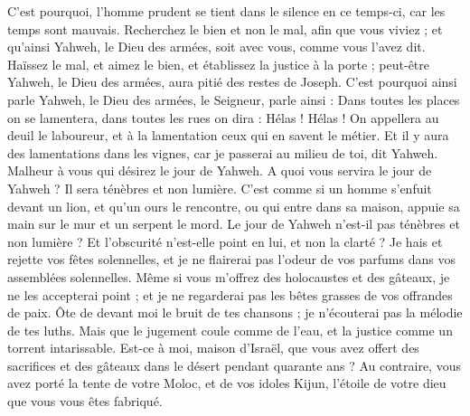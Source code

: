 \begin{multicols}{2}
C'est pourquoi, l'homme prudent se tient dans le silence en ce temps-ci, car les temps sont mauvais.
Recherchez le bien et non le mal, afin que vous viviez ; et qu'ainsi Yahweh, le Dieu des armées, soit avec vous, comme vous l'avez dit.
Haïssez le mal, et aimez le bien, et établissez la justice à la porte ; peut-être Yahweh, le Dieu des armées, aura pitié des restes de Joseph.
C'est pourquoi ainsi parle Yahweh, le Dieu des armées, le Seigneur, parle ainsi : Dans toutes les places on se lamentera, dans toutes les rues on dira : Hélas ! Hélas ! On appellera au deuil le laboureur, et à la lamentation ceux qui en savent le métier.
Et il y aura des lamentations dans les vignes, car je passerai au milieu de toi, dit Yahweh.
Malheur à vous qui désirez le jour de Yahweh. A quoi vous servira le jour de Yahweh ? Il sera ténèbres et non  lumière.
C'est comme si un homme s'enfuit devant un lion, et qu'un ours le rencontre, ou qui entre dans sa maison, appuie sa main sur le mur et un serpent le mord.
Le jour de Yahweh n'est-il pas ténèbres et non lumière ? Et l'obscurité n'est-elle point en lui, et non la clarté ?
Je hais et rejette vos fêtes solennelles, et je ne flairerai pas l'odeur de vos parfums dans vos assemblées solennelles.
Même si vous m'offrez des holocaustes et des gâteaux, je ne les accepterai point ; et je ne regarderai pas les bêtes grasses de vos offrandes de paix.
Ôte de devant moi le bruit de tes chansons ; je n'écouterai pas la mélodie de tes luths.
Mais que le jugement coule comme de l'eau, et la justice comme un torrent intarissable.
Est-ce à moi, maison d'Israël, que vous avez offert des sacrifices et des gâteaux dans le désert pendant quarante ans ?
Au contraire, vous avez porté la tente de votre Moloc, et de vos idoles Kijun, l'étoile de votre dieu que vous vous êtes fabriqué.

\end{multicols}
